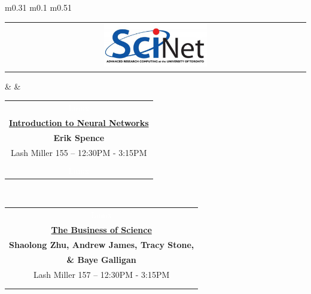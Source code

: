 \documentclass[titlepage,oneside,openany,10pt]{book}
\begin{document}
\begin{tabular}{  m{0.31\textwidth}  m{0.1\textwidth}  m{0.51\textwidth}  }
\toprule
\begin{tabular}[c]{@{}c@{}} 
\hspace{1cm}\includegraphics[width=0.35\textwidth]{Other_Figures/Scinet.png} 
\end{tabular}		& 		
& \begin{tabular}[c]{@{}c@{}}
\textcolor{white}{Linux}\\
\textbf{\underline{Introduction to Neural Networks}}\\
\textbf{Erik Spence}\\
Lash Miller 155 -- 12:30PM - 3:15PM\\
\begin{tabularx}{\linewidth}{@{}XXX@{}}
Ever wondered what neural networks are, how they work, and how you could implement them for your own research? This workshop hosted by SciNet will provide participants with theoretical and practical lessons to do just that! Bring a laptop with Jupyter notebook installed. Note that a basic knowledge of Python will be expected but is not required to participate! CBP participants at this workshop will be entered into a raffle for a \$15 gift card of their choice. \\
\textcolor{white}{Linux}
\end{tabularx}
\end{tabular}	\\
\midrule
\begin{tabular}[c]{@{}c@{}} 
\textcolor{white}{Linux}\\
\textbf{\underline{The Business of Science}}\\
\textbf{Shaolong Zhu, Andrew James, Tracy Stone,}
\\\textbf{\& Baye Galligan}\\
Lash Miller 157 -- 12:30PM - 3:15PM\\
\begin{tabularx}{1.5\linewidth}{@{}XXX@{}}
Science unfortunately involves more than just exciting eurekas (or months of frustration) at the bench. The daily business and mental philosophy of doing science industry differs from the academic environment. To learn how business interacts with science, join us for presentations and an interactive Q\&A session with presenters from large research company Sanofi, local start-up biotechnology firm ProteinQure, and Lumira, a venture capitalist firm specializing in the biotechnology space.\\

\end{tabularx}
\end{tabular}
\end{tabular}
\end{document}
